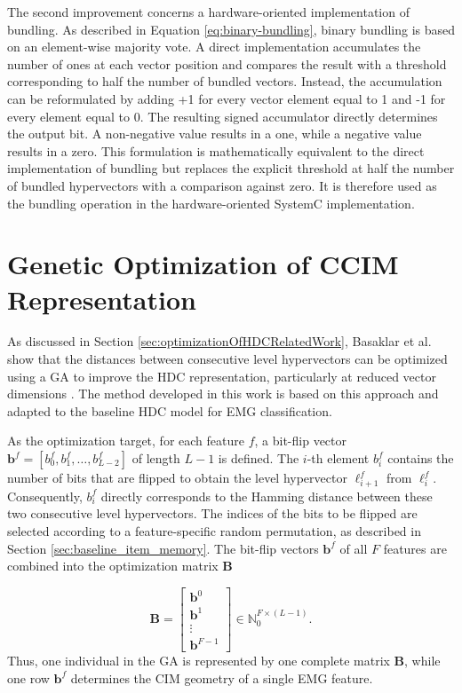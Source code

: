 The second improvement concerns a hardware-oriented implementation of bundling. As described in Equation \ref{eq:binary-bundling}, binary bundling is based on an element-wise majority vote. A direct implementation accumulates the number of ones at each vector position and compares the result with a threshold corresponding to half the number of bundled vectors. Instead, the accumulation can be reformulated by adding +1 for every vector element equal to 1 and -1 for every element equal to 0. The resulting signed accumulator directly determines the output bit. A non-negative value results in a one, while a negative value results in a zero. This formulation is mathematically equivalent to the direct implementation of bundling but replaces the explicit threshold at half the number of bundled hypervectors with a comparison against zero. It is therefore used as the bundling operation in the hardware-oriented SystemC implementation.


\section{Genetic Optimization of CCIM Representation}
\label{sec:GA}

As discussed in Section \ref{sec:optimizationOfHDCRelatedWork}, Basaklar et al. show that the distances between consecutive level hypervectors can be optimized using a \ac{GA} to improve the HDC representation, particularly at reduced vector dimensions \cite{basaklar_hypervector_2021}. The method developed in this work is based on this approach and adapted to the baseline HDC model for EMG classification.

As the optimization target, for each feature $f$, a bit-flip vector $\mathbf{b}^f = [b^f_0,b^f_1,\ldots,b^f_{L-2}]$ of length $L-1$ is defined. The $i$-th element $b_i^f$ contains the number of bits that are flipped to obtain the level hypervector $\boldsymbol{\ell}^f_{i+1}$ from $\boldsymbol{\ell}^f_i$. Consequently, $b^f_i$ directly corresponds to the Hamming distance between these two consecutive level hypervectors. The indices of the bits to be flipped are selected according to a feature-specific random permutation, as described in Section \ref{sec:baseline_item_memory}. 
The bit-flip vectors $\mathbf{b}^f$ of all $F$ features are combined into the optimization matrix $\mathbf{B}$

\[
\mathbf{B}
=
\begin{bmatrix}
\mathbf{b}^0\\
\mathbf{b}^1\\
\vdots\\
\mathbf{b}^{F-1}
\end{bmatrix}
\in \mathbb{N}_0^{F\times(L-1)}.
\]
Thus, one individual in the GA is represented by one complete matrix $\mathbf{B}$, while one row $\mathbf{b}^f$ determines the CIM geometry of a single EMG feature.

